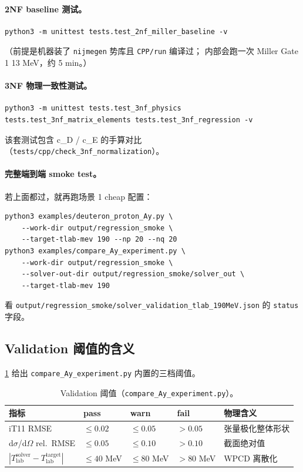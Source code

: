\paragraph{2NF baseline 测试。}
\begin{lstlisting}[style=config]
python3 -m unittest tests.test_2nf_miller_baseline -v
\end{lstlisting}
（前提是机器装了 \texttt{nijmegen} 势库且 \texttt{CPP/run} 编译过；
内部会跑一次 Miller Gate 1 13 MeV，约 5 min。）

\paragraph{3NF 物理一致性测试。}
\begin{lstlisting}[style=config]
python3 -m unittest tests.test_3nf_physics tests.test_3nf_matrix_elements tests.test_3nf_regression -v
\end{lstlisting}
该套测试包含 c\_D / c\_E 的手算对比（\texttt{tests/cpp/check\_3nf\_normalization}）。

\paragraph{完整端到端 smoke test。}
若上面都过，就再跑场景 1 cheap 配置：
\begin{lstlisting}[style=config]
python3 examples/deuteron_proton_Ay.py \
    --work-dir output/regression_smoke \
    --target-tlab-mev 190 --np 20 --nq 20
python3 examples/compare_Ay_experiment.py \
    --work-dir output/regression_smoke \
    --solver-out-dir output/regression_smoke/solver_out \
    --target-tlab-mev 190
\end{lstlisting}
看 \texttt{output/regression\_smoke/solver\_validation\_tlab\_190MeV.json} 的 \texttt{status} 字段。

\subsection{Validation 阈值的含义}
\label{sec:ch20-reg-thresh}

\cref{tab:ch20-reg-thresh} 给出 \texttt{compare\_Ay\_experiment.py} 内置的三档阈值。

\begin{table}[ht]
\centering
\small
\caption{Validation 阈值（\texttt{compare\_Ay\_experiment.py}）。}
\label{tab:ch20-reg-thresh}
\begin{tabular}{@{}lllll@{}}
\toprule
指标 & pass & warn & fail & 物理含义 \\
\midrule
iT11 RMSE          & $\le 0.02$  & $\le 0.05$  & $> 0.05$  & 张量极化整体形状 \\
d$\sigma$/d$\Omega$ rel.\ RMSE & $\le 0.05$  & $\le 0.10$  & $> 0.10$  & 截面绝对值 \\
$|T_{\mathrm{lab}}^{\text{solver}} - T_{\mathrm{lab}}^{\text{target}}|$ & $\le 40$ MeV & $\le 80$ MeV & $> 80$ MeV & WPCD 离散化 \\
\bottomrule
\end{tabular}
\end{table}

